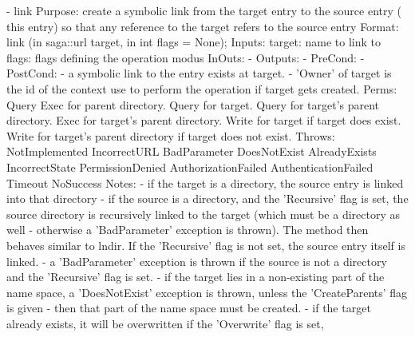 \begin{myspec}
 
    - link
      Purpose:  create a symbolic link from the target entry to
                the source entry ( this entry) so that any reference 
                to the target refers to the source entry
      Format:   link               (in  saga::url target,
                                    in  int       flags = None);
      Inputs:   target:             name to link to
                flags:              flags defining the operation
                                    modus
      InOuts:   -
      Outputs:  -
      PreCond:  -
      PostCond: - a symbolic link to the entry exists at target.
                - 'Owner' of target is the id of the context
                  use to perform the operation if target gets
                  created.
      Perms:    Query 
                Exec  for parent directory.
                Query for target.
                Query for target's parent directory.
                Exec  for target's parent directory.
                Write for target
                      if  target does exist.
                Write for target's parent directory 
                      if  target does not exist.
      Throws:   NotImplemented
                IncorrectURL
                BadParameter
                DoesNotExist
                AlreadyExists
                IncorrectState
                PermissionDenied
                AuthorizationFailed
                AuthenticationFailed
                Timeout
                NoSuccess
      Notes:    - if the target is a directory, the source entry
                  is linked into that directory
                - if the source is a directory, and the
                  'Recursive' flag is set, the source directory
                  is recursively linked to the target (which must
                  be a directory as well - otherwise a
                  'BadParameter' exception is thrown).  The
                  method then behaves similar to lndir.  If the
                  'Recursive' flag is not set, the source entry
                  itself is linked.  
                - a 'BadParameter' exception is thrown if the 
                  source is not a directory and the 'Recursive' 
                  flag is set.
                - if the target lies in a non-existing part of
                  the name space, a 'DoesNotExist' exception is
                  thrown, unless the 'CreateParents' flag is
                  given - then that part of the name space must
                  be created.
                - if the target already exists, it will be
                  overwritten if the 'Overwrite' flag is set,

\end{myspec}

